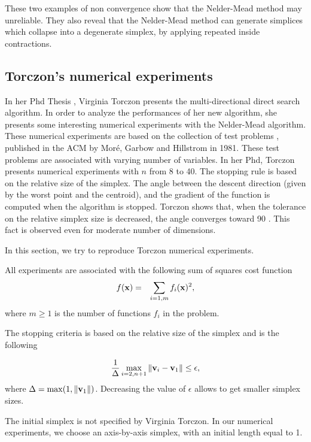 These two examples of non convergence show that the Nelder-Mead method may unreliable.
They also reveal that the Nelder-Mead method can generate simplices which collapse 
into a degenerate simplex, by applying repeated inside contractions.

\subsection{Torczon's numerical experiments}

In her Phd Thesis \cite{Torczon89multi-directionalsearch}, Virginia Torczon 
presents the multi-directional direct search algorithm. In order to analyze the 
performances of her new algorithm, she presents some interesting numerical 
experiments with the Nelder-Mead algorithm. 
These numerical experiments are based on the collection of test problems \cite{355943},
published in the ACM by Mor\'e, Garbow and Hillstrom in 1981. 
These test problems are associated with varying number of variables.
In her Phd, Torczon presents numerical experiments with $n$ from 8 
to 40.
The stopping rule is based on the relative size of the simplex. 
The angle between the descent direction (given by the worst point and the centroid), and the
gradient of the function is computed when the algorithm is stopped.
Torczon shows that, when the tolerance on the relative simplex size is decreased, the 
angle converges toward 90 \degre. This fact is observed even for moderate 
number of dimensions.

In this section, we try to reproduce Torczon numerical experiments.

All experiments are associated with the following sum of squares cost function 
\begin{eqnarray}
\label{torzcon-sumofsquares}
f(\mathbf{x}) &=& \sum_{i=1,m} f_i(\mathbf{x})^2,
\end{eqnarray}
where $m\geq 1$ is the number of functions $f_i$ in the problem.

The stopping criteria is based on the relative size of the 
simplex and is the following 

\begin{eqnarray}
\label{torzcon-stopping}
\frac{1}{\Delta} \max_{i=2,n+1} \|\mathbf{v}_i - \mathbf{v}_1\| \leq \epsilon,
\end{eqnarray}
where $\Delta = \max( 1 , \|\mathbf{v}_1\| )$. Decreasing the value of 
$\epsilon$ allows to get smaller simplex sizes.

The initial simplex is not specified by Virginia Torczon.
In our numerical experiments, we choose an axis-by-axis simplex,
with an initial length equal to 1.


